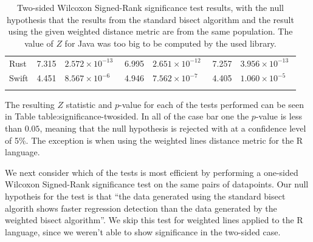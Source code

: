 \documentclass[pdflatex, sn-mathphys, referee]{sn-jnl}%
\theoremstyle{thmstyleone}%
\theoremstyle{thmstyletwo}%
\theoremstyle{thmstylethree}%
\def\0{\phantom{0}}
\theoremstyle{thmstyleone}
\begin{document}
\begin{table}
\begin{center}
\begin{minipage}{0.75\textwidth}
\begin{tabular*}{\textwidth}{l r r r r r r}
Rust & 7.315 & $2.572 \times 10^{-13\0}$ & 6.995 & $2.651 \times 10^{-12\0}$ & 7.257 & $3.956 \times 10^{-13\0}$ \\
Swift & 4.451 & $8.567 \times 10^{-6\0\0}$ & 4.946 & $7.562 \times 10^{-7\0\0}$ & 4.405 & $1.060 \times 10^{-5\0\0}$ \\
\botrule
\end{tabular*}
\caption{\label{table:significance-twosided}Two-sided Wilcoxon Signed-Rank significance test results, with the null hypothesis that the results from the standard bisect algorithm and the result using the given weighted distance metric are from the same population. The value of $Z$ for Java was too big to be computed by the used library.}
\end{minipage}
\end{center}
\end{table}

The resulting $Z$ statistic and $p$-value for each of the tests performed can be seen in Table table:significance-twosided. In all of the case bar one the $p$-value is less than $0.05$, meaning that the null hypothesis is rejected with at a confidence level of 5\%. The exception is when using the weighted lines distance metric for the R language.

We next consider which of the tests is most efficient by performing a one-sided Wilcoxon Signed-Rank significance test on the same pairs of datapoints. Our null hypotheis for the test is that ``the data generated using the standard bisect algorith shows faster regression detection than the data generated by the weighted bisect algorithm''. We skip this test for weighted lines applied to the R language, since we weren't able to show significance in the two-sided case.
\end{document}

